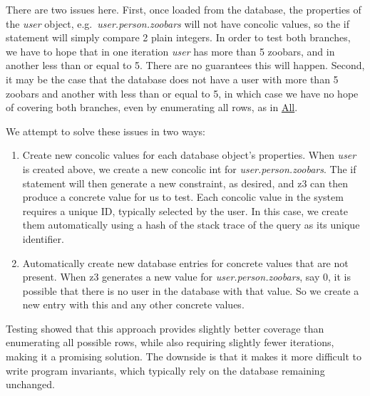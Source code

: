 \documentclass{scrartcl}
\begin{document}
\begin{enumerate}
There are two issues here. First, once loaded from the database, the properties
of the \textit{user} object, e.g.\ \textit{user.person.zoobars} will not have
concolic values, so the if statement will simply compare 2
plain integers. In order to test both branches, we have to hope that
in one iteration \textit{user} has more than 5 zoobars, and in another less than
or equal to 5. There are no guarantees this will happen. Second, it may be the
case that the database does not have a user with more than 5 zoobars and another
with less than or equal to 5, in which case we have no
hope of covering both branches, even by enumerating all rows, as in
\underline{All}.

We attempt to solve these issues in two ways:
\begin{enumerate}
\item Create new concolic values for each database object's properties. When
\textit{user} is created above, we create a new concolic int for
\textit{user.person.zoobars}. The if statement will then generate a
new constraint, as desired, and z3 can then produce a concrete value for us
to test. Each concolic value in the system requires a unique ID, typically
selected by the user. In this case, we create them automatically using a
hash of the stack trace of the query as its unique identifier.

\item Automatically create new database entries for concrete values that are
not present. When z3 generates a new value for \textit{user.person.zoobars},
say 0, it is possible that there is no user in the database with that value.
So we create a new entry with this and any other concrete values.
\end{enumerate}

Testing showed that this approach provides slightly better coverage than
enumerating all possible
rows, while also requiring slightly fewer iterations, making it a promising
solution. The downside is that it makes it more difficult to write program
invariants, which typically rely on the database remaining unchanged.

\end{enumerate}
\end{document}
